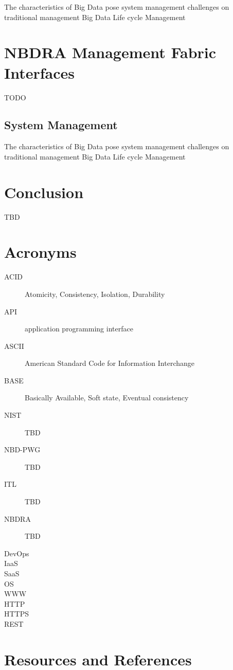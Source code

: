 \documentclass[11pt]{article}
\begin{document}
The characteristics of Big Data pose system management challenges on traditional management Big Data 
Life cycle Management

\section{NBDRA Management Fabric Interfaces}
TODO

\subsection{System Management}

The characteristics of Big Data pose system management challenges on traditional management Big Data 
Life cycle Management

\section{Conclusion }
TBD

\appendix

\section{Acronyms}

\begin{description}
\item[ACID] 	Atomicity, Consistency, Isolation, Durability
\item[API] 	application programming interface 
\item[ASCII] 	American Standard Code for Information Interchange
\item[BASE] 	Basically Available, Soft state, Eventual consistency
\item[NIST] TBD
\item[NBD-PWG] TBD
\item[ITL] TBD
\item[NBDRA] TBD
\item[DevOps]
\item[IaaS]
\item[SaaS]
\item[OS]
\item[WWW]
\item[HTTP]
\item[HTTPS]
\item[REST]

\end{description}

\section{Resources and References}
\end{document}
